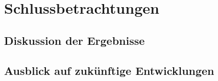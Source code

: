 \chapter{Schlussbetrachtungen}\label{ch:conclusion}

\section{Diskussion der Ergebnisse}
\section{Ausblick auf zukünftige Entwicklungen}